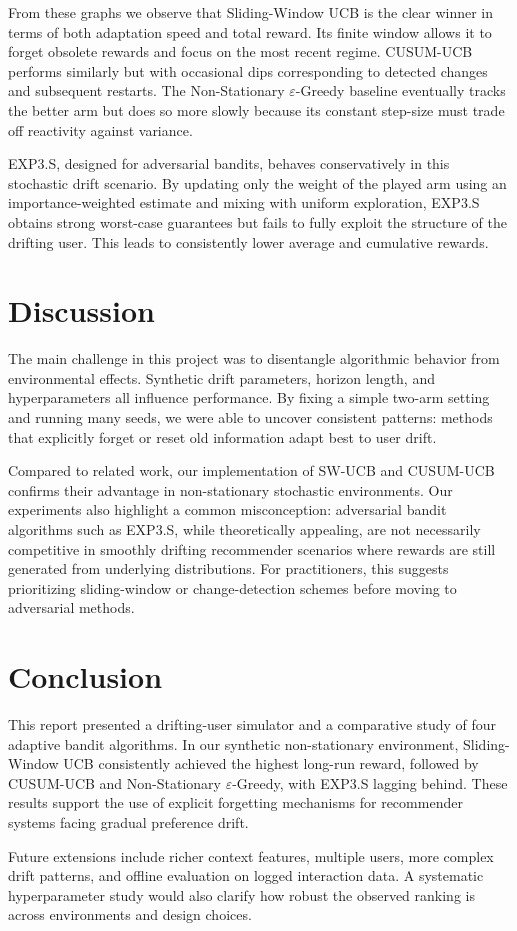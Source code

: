 \documentclass{scrartcl}
\begin{document}
From these graphs we observe that Sliding-Window UCB is the clear winner in
terms of both adaptation speed and total reward. Its finite window allows it
to forget obsolete rewards and focus on the most recent regime. CUSUM-UCB
performs similarly but with occasional dips corresponding to detected changes
and subsequent restarts. The Non-Stationary $\varepsilon$-Greedy baseline
eventually tracks the better arm but does so more slowly because its constant
step-size must trade off reactivity against variance.

EXP3.S, designed for adversarial bandits, behaves conservatively in this
stochastic drift scenario. By updating only the weight of the played arm using
an importance-weighted estimate and mixing with uniform exploration, EXP3.S
obtains strong worst-case guarantees but fails to fully exploit the structure
of the drifting user. This leads to consistently lower average and cumulative
rewards.

\section{Discussion}

The main challenge in this project was to disentangle algorithmic behavior
from environmental effects. Synthetic drift parameters, horizon length, and
hyperparameters all influence performance. By fixing a simple two-arm setting
and running many seeds, we were able to uncover consistent patterns: methods
that explicitly forget or reset old information adapt best to user drift.

Compared to related work, our implementation of SW-UCB and CUSUM-UCB confirms
their advantage in non-stationary stochastic environments. Our experiments also
highlight a common misconception: adversarial bandit algorithms such as
EXP3.S, while theoretically appealing, are not necessarily competitive in
smoothly drifting recommender scenarios where rewards are still generated from
underlying distributions. For practitioners, this suggests prioritizing
sliding-window or change-detection schemes before moving to adversarial
methods.

\section{Conclusion}

This report presented a drifting-user simulator and a comparative study of four
adaptive bandit algorithms. In our synthetic non-stationary environment,
Sliding-Window UCB consistently achieved the highest long-run reward, followed
by CUSUM-UCB and Non-Stationary $\varepsilon$-Greedy, with EXP3.S lagging
behind. These results support the use of explicit forgetting mechanisms for
recommender systems facing gradual preference drift.

Future extensions include richer context features, multiple users, more complex
drift patterns, and offline evaluation on logged interaction data. A systematic
hyperparameter study would also clarify how robust the observed ranking is
across environments and design choices.



\end{document}

